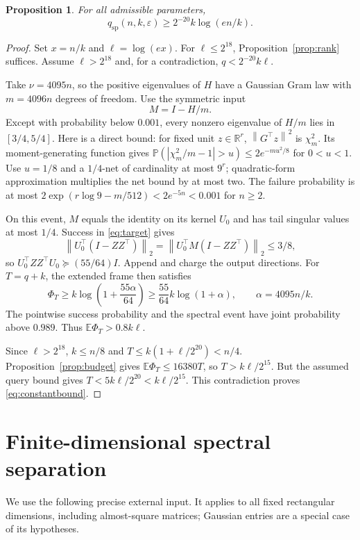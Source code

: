 \documentclass[11pt]{article}
\numberwithin{equation}{section}
\newtheorem{proposition}[theorem]{Proposition}
\theoremstyle{remark}\newtheorem{remark}[theorem]{Remark}
\newcommand{\R}{\mathbb R}
\newcommand{\E}{\mathbb E}
\newcommand{\Prob}{\mathbb P}
\newcommand{\eps}{\varepsilon}
\newcommand{\qsp}{q_{\mathrm{sp}}}
\newcommand{\norm}[1]{\left\lVert #1\right\rVert}
\begin{document}
\begin{proposition}\label{prop:constant}
For all admissible parameters,
\begin{equation}\label{eq:constantbound}
\qsp(n,k,\eps)\ge 2^{-20}k\log(en/k).
\end{equation}
\end{proposition}
\begin{proof}
Set $x=n/k$ and $\ell=\log(ex)$. For $\ell\le2^{18}$, Proposition~\ref{prop:rank} suffices. Assume $\ell>2^{18}$ and, for a contradiction, $q<2^{-20}k\ell$.

Take $\nu=4095n$, so the positive eigenvalues of $H$ have a Gaussian Gram law with $m=4096n$ degrees of freedom. Use the symmetric input
\[
M=I-H/m.
\]
Except with probability below $0.001$, every nonzero eigenvalue of $H/m$ lies in $[3/4,5/4]$. Here is a direct bound: for fixed unit $z\in\R^r$, $\norm{G^\top z}^2$ is $\chi^2_m$. Its moment-generating function gives
$\Prob(|\chi^2_m/m-1|>u)\le2e^{-mu^2/8}$ for $0<u<1$. Use $u=1/8$ and a $1/4$-net of cardinality at most $9^r$; quadratic-form approximation multiplies the net bound by at most two. The failure probability is at most
$2\exp(r\log9-m/512)<2e^{-5n}<0.001$ for $n\ge2$.

On this event, $M$ equals the identity on its kernel $U_0$ and has tail singular values at most $1/4$. Success in \eqref{eq:target} gives
\[
\norm{U_0^\top(I-ZZ^\top)}_2
=\norm{U_0^\top M(I-ZZ^\top)}_2\le3/8,
\]
so $U_0^\top ZZ^\top U_0\succeq(55/64)I$. Append and charge the output directions. For $T=q+k$, the extended frame then satisfies
\[
\Phi_T\ge k\log\!\left(1+\frac{55\alpha}{64}\right)
\ge\frac{55}{64}k\log(1+\alpha),\qquad \alpha=4095n/k.
\]
The pointwise success probability and the spectral event have joint probability above $0.989$. Thus $\E\Phi_T>0.8k\ell$.

Since $\ell>2^{18}$, $k\le n/8$ and
$T\le k(1+\ell/2^{20})<n/4$. Proposition~\ref{prop:budget} gives
$\E\Phi_T\le16380T$, so $T>k\ell/2^{15}$. But the assumed query bound gives
$T<5k\ell/2^{20}<k\ell/2^{15}$. This contradiction proves \eqref{eq:constantbound}.
\end{proof}

\section{Finite-dimensional spectral separation}\label{sec:spectrum}
We use the following precise external input. It applies to all fixed rectangular dimensions, including almost-square matrices; Gaussian entries are a special case of its hypotheses.
\end{document}
